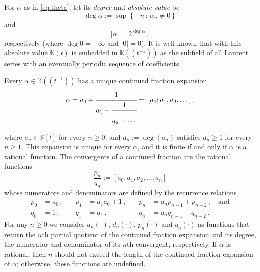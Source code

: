 \documentclass[a4paper,12pt]{article}
\def\fq{\bbk}
\def\fqt{\fq[t]}
\def\ftt{\fq(t)}
\def\fttt{\fq\!\left(\!\left(t^{-1}\right)\!\right)}
\def \q{2}
\def\sep{\,:\,}
\def\defeq{:=}
\def\eqdef{=:}
\def\bbk{\mathbb{K}}
\def\defeq{:=}
\begin{document}
For $\alpha$ as in \eqref{eq:theta}, let its \emph{degree} and \emph{absolute value} %
be 
$$\deg\alpha\defeq\sup\left\{ -n\sep \alpha_n\neq0\right\}$$
and 
$$\left|\alpha\right|=\q^{\deg\alpha}\,,$$ 
respectively (where $\deg0=-\infty$ and $\left|0\right|=0$). 
It is well known that with this absolute value $\ftt$ is embedded in $\fttt$ as the subfield of all Laurent series with an eventually periodic sequence of coefficients.

Every $\alpha\in\fttt$ has a unique continued fraction expansion
$$
\alpha=a_0+\cfrac{1}{a_1+\cfrac{1}{a_2+\cdots\vphantom{\cfrac{1}{1}}}}\eqdef[a_0;a_1,a_2,\dots]\,,
$$
where $a_n\in\fqt$ for every $n\geq0$, and $d_n\defeq\deg(a_n)$ satisfies $d_n\geq1$ for every $n \geq 1$. This expansion is unique for every $\alpha$, and it is finite if and only if $\alpha$ is a rational function. The convergents of a continued fraction are the rational functions
$$
\frac{p_n}{q_n}:=[a_0;a_1,a_2,\ldots,a_n]
$$
whose numerators and denominators are defined by the recurrence relations
\begin{equation*}%
\begin{aligned}
    p_0&=a_0\,,\quad &p_1&=a_1a_0+1\,,\quad
    &p_{n}&=a_{n}p_{n-1}+p_{n-2}\,,\quad\textrm{and}\\
    q_0&=1\,,\quad&q_1&=a_1\,,\quad
    &q_{n}&=a_{n}q_{n-1}+q_{n-2}\,.
\end{aligned}
\end{equation*}
For any $n\ge0$ we consider $a_n(\cdot)$, $d_n(\cdot)$, $p_n(\cdot)$ and $q_n(\cdot)$ as functions that return the $n$th partial quotient of the continued fraction expansion and its degree, the numerator and denominator of its $n$th convergent, respectively. If $\alpha$ is rational, then $n$ should not exceed the length of the continued fraction expansion of $\alpha$; otherwise, these functions are undefined.
\end{document}
